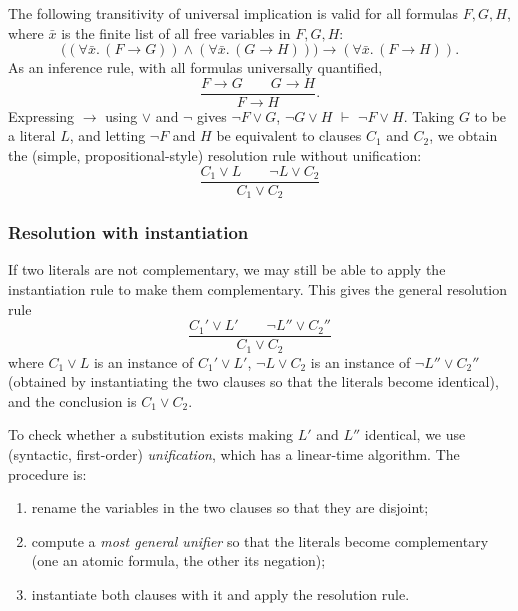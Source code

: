 The following transitivity of universal implication is valid for all formulas $F, G, H$, where $\bar x$ is the finite list of all free variables in $F, G, H$:
\[
\big((\forall \bar x.\, (F \rightarrow G)) \wedge (\forall \bar x.\, (G \rightarrow H))\big) \rightarrow (\forall \bar x.\, (F \rightarrow H)).
\]
As an inference rule, with all formulas universally quantified,
\[
\frac{F \rightarrow G \qquad G \rightarrow H}{F \rightarrow H}.
\]
Expressing $\rightarrow$ using $\vee$ and $\neg$ gives $\neg F \vee G$, $\neg G \vee H$ $\vdash$ $\neg F \vee H$. Taking $G$ to be a literal $L$, and letting $\neg F$ and $H$ be equivalent to clauses $C_1$ and $C_2$, we obtain the (simple, propositional-style) resolution rule without unification:
\[
\frac{C_1 \vee L \qquad \neg L \vee C_2}{C_1 \vee C_2}
\]
 
\subsubsection*{Resolution with instantiation}
 
 
If two literals are not complementary, we may still be able to apply the instantiation rule to make them complementary. This gives the general resolution rule
\[
\frac{C_1' \vee L' \qquad \neg L'' \vee C_2''}{C_1 \vee C_2}
\]
where $C_1 \vee L$ is an instance of $C_1' \vee L'$, $\neg L \vee C_2$ is an instance of $\neg L'' \vee C_2''$ (obtained by instantiating the two clauses so that the literals become identical), and the conclusion is $C_1 \vee C_2$.
 
To check whether a substitution exists making $L'$ and $L''$ identical, we use (syntactic, first-order) \emph{unification}, which has a linear-time algorithm. The procedure is:
\begin{enumerate}
  \item rename the variables in the two clauses so that they are disjoint;
  \item compute a \emph{most general unifier} so that the literals become complementary (one an atomic formula, the other its negation);
  \item instantiate both clauses with it and apply the resolution rule.
\end{enumerate}
% 
